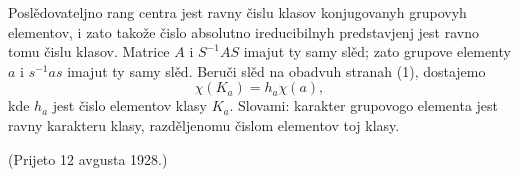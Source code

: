 \documentclass[11pt]{article}
\begin{document}
Poslědovateljno rang centra jest ravny čislu klasov konjugovanyh grupovyh elementov, i zato takože čislo absolutno ireducibilnyh predstavjenj jest ravno tomu čislu klasov. Matrice $A$ i $S^{-1}AS$ imajut ty samy slěd; zato grupove elementy $a$ i $s^{-1}as$ imajut ty samy slěd. Beruči slěd na obadvuh stranah (1), dostajemo
\[
        \chi(K_a)=h_a\chi(a),
\]
kde $h_a$ jest čislo elementov klasy $K_a$. Slovami: karakter grupovogo elementa jest ravny karakteru klasy, razděljenomu čislom elementov toj klasy.

\begin{center}
(Prijeto 12 avgusta 1928.)
\end{center}
\end{document}
